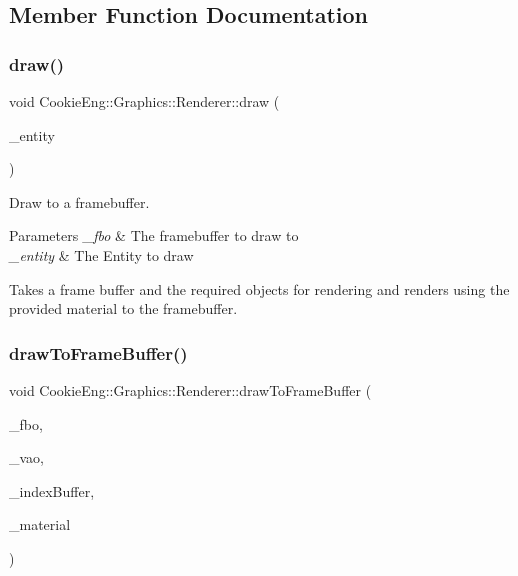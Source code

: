 \subsection{Member Function Documentation}
\mbox{\label{class_cookie_eng_1_1_graphics_1_1_renderer_a5cadfbd80259f0188e52880c47ac7573}} 
\subsubsection{\texorpdfstring{draw()}{draw()}}
{\footnotesize\ttfamily void Cookie\+Eng\+::\+Graphics\+::\+Renderer\+::draw (\begin{DoxyParamCaption}\item[{\hyperlink{class_cookie_eng_1_1_e_c_s_1_1_entity}{E\+C\+S\+::\+Entity} \&}]{\+\_\+entity }\end{DoxyParamCaption})}



Draw to a framebuffer. 


\begin{DoxyParams}{Parameters}
{\em \+\_\+fbo} & The framebuffer to draw to \\
\hline
{\em \+\_\+entity} & The Entity to draw\\
\hline
\end{DoxyParams}
Takes a frame buffer and the required objects for rendering and renders using the provided material to the framebuffer. \mbox{\label{class_cookie_eng_1_1_graphics_1_1_renderer_aa32e62971f191a434ab457f9ac84ac31}} 
\subsubsection{\texorpdfstring{draw\+To\+Frame\+Buffer()}{drawToFrameBuffer()}}
{\footnotesize\ttfamily void Cookie\+Eng\+::\+Graphics\+::\+Renderer\+::draw\+To\+Frame\+Buffer (\begin{DoxyParamCaption}\item[{const \hyperlink{class_cookie_eng_1_1_graphics_1_1_frame_buffer}{Frame\+Buffer} \&}]{\+\_\+fbo,  }\item[{const \hyperlink{class_cookie_eng_1_1_graphics_1_1_vertex_array}{Vertex\+Array} \&}]{\+\_\+vao,  }\item[{const \hyperlink{class_cookie_eng_1_1_graphics_1_1_vertex_buffer}{Vertex\+Buffer} \&}]{\+\_\+index\+Buffer,  }\item[{const \hyperlink{class_cookie_eng_1_1_resources_1_1_material}{Resources\+::\+Material} \&}]{\+\_\+material }\end{DoxyParamCaption})}



